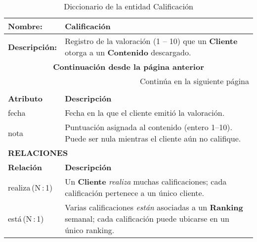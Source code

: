 \renewcommand{\arraystretch}{1.3}
\begin{longtable}{|p{3.5cm}|p{10cm}|}
\caption{Diccionario de la entidad Calificación}
\label{tab:diccionarioCalificacion} \\ 
\hline
\textbf{Nombre:} & Calificación \\
\hline
\textbf{Descripción:} & 
Registro de la valoración (1 – 10) que un \textbf{Cliente} otorga a un
\textbf{Contenido} descargado. \\ \hline
\endfirsthead

\multicolumn{2}{c}{\textbf{Continuación desde la página anterior}} \\ 
\endhead

\hline \multicolumn{2}{r}{{Continúa en la siguiente página}} \\ 
\endfoot

\hline
\endlastfoot

\multicolumn{2}{|p{13.5cm}|}{\textbf{ATRIBUTOS}} \\ \hline
\textbf{Atributo} & \textbf{Descripción} \\ \hline
fecha            & Fecha en la que el cliente emitió la valoración. \\ \hline
nota             & Puntuación asignada al contenido (entero 1–10). Puede ser nula mientras el cliente aún no califique. \\ \hline

\multicolumn{2}{|p{13.5cm}|}{\textbf{RELACIONES}} \\ \hline
\textbf{Relación} & \textbf{Descripción} \\ \hline
realiza\,(N\,:\,1) & Un \textbf{Cliente} \textit{realiza} muchas calificaciones;  
cada calificación pertenece a un único cliente. \\ \hline
está\,(N\,:\,1) & Varias calificaciones \textit{están} asociadas a un  
\textbf{Ranking} semanal; cada calificación puede ubicarse en un único ranking. \\ \hline
\end{longtable}